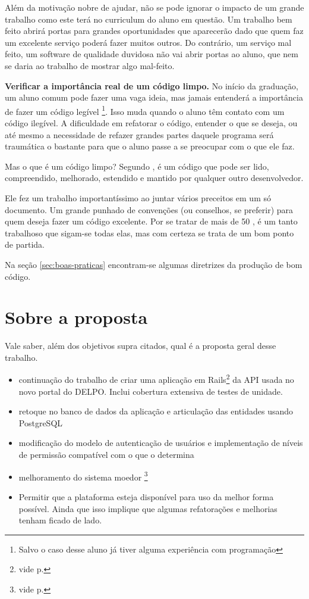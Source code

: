 Além da motivação nobre de ajudar, não se pode ignorar o impacto de um grande trabalho como
este terá no curriculum do aluno em questão. Um trabalho bem feito abrirá portas para grandes
oportunidades que aparecerão dado que quem faz um excelente serviço poderá fazer muitos outros.
Do contrário, um serviço mal feito, um software de qualidade duvidosa não vai abrir portas ao
aluno, que nem se daria ao trabalho de mostrar algo mal-feito.

\textbf{Verificar a importância real de um código limpo.} No início da graduação, um aluno comum
pode fazer uma vaga ideia, mas jamais entenderá a importância de fazer um código legível
\footnote{Salvo o caso desse aluno já tiver alguma experiência com programação}. Isso muda quando
o aluno têm contato com um código ilegível. A dificuldade em refatorar o código, entender o que se
deseja, ou até mesmo a necessidade de refazer grandes partes daquele programa será traumática o
bastante para que o aluno passe a se preocupar com o que ele faz.

Mas o que é um código limpo? Segundo \citeauthor{CCL}, é um código que pode ser lido, compreendido,
melhorado, estendido e mantido por qualquer outro desenvolvedor.

Ele fez um trabalho importantíssimo ao juntar vários preceitos em um só documento. Um grande punhado
de convenções (ou conselhos, se preferir) para quem deseja fazer um código excelente. Por se tratar de
mais de 50 , é um tanto trabalhoso que sigam-se todas elas, mas com certeza se trata de um bom
ponto de partida.

Na seção \ref{sec:boas-praticas} encontram-se algumas diretrizes da produção de bom código.

\section{Sobre a proposta} \label{sec:proposta}

Vale saber, além dos objetivos supra citados, qual é a proposta geral desse trabalho.
\begin{itemize}
    \item continuação do trabalho de criar uma aplicação em Rails\footnote{vide p.\pageref{subsec:rails}}
    da API usada no novo portal do DELPO. Inclui cobertura extensiva de testes de unidade.
    \item retoque no banco de dados da aplicação e articulação das entidades usando PostgreSQL
    \item modificação do modelo de autenticação de usuários e implementação de níveis de permissão compatível
    com o que o  determina
    \item melhoramento do sistema moedor \footnote{vide p.\pageref{subsec:moagem}}
    \item Permitir que a plataforma esteja disponível para uso da melhor forma possível. Ainda que isso
    implique que algumas refatorações e melhorias tenham ficado de lado.
\end{itemize}

